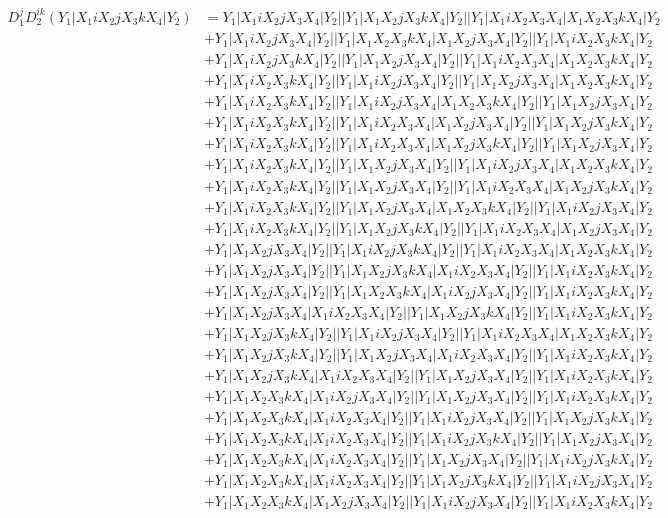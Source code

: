 \documentclass{article}[12pt]
\begin{document}
\begin{align*}
D_1^jD_2^{ik}(Y_1|X_1iX_2jX_3kX_4|Y_2)& =Y_1|X_1iX_2jX_3X_4|Y_2||Y_1|X_1X_2jX_3kX_4|Y_2||Y_1|X_1iX_2X_3X_4|X_1X_2X_3kX_4|Y_2\\ 
 & +Y_1|X_1iX_2jX_3X_4|Y_2||Y_1|X_1X_2X_3kX_4|X_1X_2jX_3X_4|Y_2||Y_1|X_1iX_2X_3kX_4|Y_2\\ 
 & +Y_1|X_1iX_2jX_3kX_4|Y_2||Y_1|X_1X_2jX_3X_4|Y_2||Y_1|X_1iX_2X_3X_4|X_1X_2X_3kX_4|Y_2\\ 
 & +Y_1|X_1iX_2X_3kX_4|Y_2||Y_1|X_1iX_2jX_3X_4|Y_2||Y_1|X_1X_2jX_3X_4|X_1X_2X_3kX_4|Y_2\\ 
 & +Y_1|X_1iX_2X_3kX_4|Y_2||Y_1|X_1iX_2jX_3X_4|X_1X_2X_3kX_4|Y_2||Y_1|X_1X_2jX_3X_4|Y_2\\ 
 & +Y_1|X_1iX_2X_3kX_4|Y_2||Y_1|X_1iX_2X_3X_4|X_1X_2jX_3X_4|Y_2||Y_1|X_1X_2jX_3kX_4|Y_2\\ 
 & +Y_1|X_1iX_2X_3kX_4|Y_2||Y_1|X_1iX_2X_3X_4|X_1X_2jX_3kX_4|Y_2||Y_1|X_1X_2jX_3X_4|Y_2\\ 
 & +Y_1|X_1iX_2X_3kX_4|Y_2||Y_1|X_1X_2jX_3X_4|Y_2||Y_1|X_1iX_2jX_3X_4|X_1X_2X_3kX_4|Y_2\\ 
 & +Y_1|X_1iX_2X_3kX_4|Y_2||Y_1|X_1X_2jX_3X_4|Y_2||Y_1|X_1iX_2X_3X_4|X_1X_2jX_3kX_4|Y_2\\ 
 & +Y_1|X_1iX_2X_3kX_4|Y_2||Y_1|X_1X_2jX_3X_4|X_1X_2X_3kX_4|Y_2||Y_1|X_1iX_2jX_3X_4|Y_2\\ 
 & +Y_1|X_1iX_2X_3kX_4|Y_2||Y_1|X_1X_2jX_3kX_4|Y_2||Y_1|X_1iX_2X_3X_4|X_1X_2jX_3X_4|Y_2\\ 
 & +Y_1|X_1X_2jX_3X_4|Y_2||Y_1|X_1iX_2jX_3kX_4|Y_2||Y_1|X_1iX_2X_3X_4|X_1X_2X_3kX_4|Y_2\\ 
 & +Y_1|X_1X_2jX_3X_4|Y_2||Y_1|X_1X_2jX_3kX_4|X_1iX_2X_3X_4|Y_2||Y_1|X_1iX_2X_3kX_4|Y_2\\ 
 & +Y_1|X_1X_2jX_3X_4|Y_2||Y_1|X_1X_2X_3kX_4|X_1iX_2jX_3X_4|Y_2||Y_1|X_1iX_2X_3kX_4|Y_2\\ 
 & +Y_1|X_1X_2jX_3X_4|X_1iX_2X_3X_4|Y_2||Y_1|X_1X_2jX_3kX_4|Y_2||Y_1|X_1iX_2X_3kX_4|Y_2\\ 
 & +Y_1|X_1X_2jX_3kX_4|Y_2||Y_1|X_1iX_2jX_3X_4|Y_2||Y_1|X_1iX_2X_3X_4|X_1X_2X_3kX_4|Y_2\\ 
 & +Y_1|X_1X_2jX_3kX_4|Y_2||Y_1|X_1X_2jX_3X_4|X_1iX_2X_3X_4|Y_2||Y_1|X_1iX_2X_3kX_4|Y_2\\ 
 & +Y_1|X_1X_2jX_3kX_4|X_1iX_2X_3X_4|Y_2||Y_1|X_1X_2jX_3X_4|Y_2||Y_1|X_1iX_2X_3kX_4|Y_2\\ 
 & +Y_1|X_1X_2X_3kX_4|X_1iX_2jX_3X_4|Y_2||Y_1|X_1X_2jX_3X_4|Y_2||Y_1|X_1iX_2X_3kX_4|Y_2\\ 
 & +Y_1|X_1X_2X_3kX_4|X_1iX_2X_3X_4|Y_2||Y_1|X_1iX_2jX_3X_4|Y_2||Y_1|X_1X_2jX_3kX_4|Y_2\\ 
 & +Y_1|X_1X_2X_3kX_4|X_1iX_2X_3X_4|Y_2||Y_1|X_1iX_2jX_3kX_4|Y_2||Y_1|X_1X_2jX_3X_4|Y_2\\ 
 & +Y_1|X_1X_2X_3kX_4|X_1iX_2X_3X_4|Y_2||Y_1|X_1X_2jX_3X_4|Y_2||Y_1|X_1iX_2jX_3kX_4|Y_2\\ 
 & +Y_1|X_1X_2X_3kX_4|X_1iX_2X_3X_4|Y_2||Y_1|X_1X_2jX_3kX_4|Y_2||Y_1|X_1iX_2jX_3X_4|Y_2\\ 
 & +Y_1|X_1X_2X_3kX_4|X_1X_2jX_3X_4|Y_2||Y_1|X_1iX_2jX_3X_4|Y_2||Y_1|X_1iX_2X_3kX_4|Y_2\end{align*}
\end{document}
